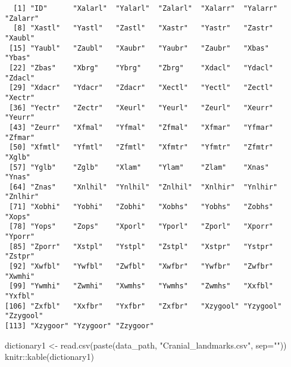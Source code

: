 \documentclass[
  letterpaper,
  DIV=11,
  numbers=noendperiod]{scrartcl}
\newenvironment{Shaded}{\begin{snugshade}}{\end{snugshade}}
\newcommand{\AttributeTok}[1]{\textcolor[rgb]{0.40,0.45,0.13}{#1}}
\newcommand{\FunctionTok}[1]{\textcolor[rgb]{0.28,0.35,0.67}{#1}}
\newcommand{\NormalTok}[1]{\textcolor[rgb]{0.00,0.23,0.31}{#1}}
\newcommand{\OtherTok}[1]{\textcolor[rgb]{0.00,0.23,0.31}{#1}}
\newcommand{\SpecialCharTok}[1]{\textcolor[rgb]{0.37,0.37,0.37}{#1}}
\newcommand{\StringTok}[1]{\textcolor[rgb]{0.13,0.47,0.30}{#1}}
\begin{document}
\begin{verbatim}
  [1] "ID"      "Xalarl"  "Yalarl"  "Zalarl"  "Xalarr"  "Yalarr"  "Zalarr" 
  [8] "Xastl"   "Yastl"   "Zastl"   "Xastr"   "Yastr"   "Zastr"   "Xaubl"  
 [15] "Yaubl"   "Zaubl"   "Xaubr"   "Yaubr"   "Zaubr"   "Xbas"    "Ybas"   
 [22] "Zbas"    "Xbrg"    "Ybrg"    "Zbrg"    "Xdacl"   "Ydacl"   "Zdacl"  
 [29] "Xdacr"   "Ydacr"   "Zdacr"   "Xectl"   "Yectl"   "Zectl"   "Xectr"  
 [36] "Yectr"   "Zectr"   "Xeurl"   "Yeurl"   "Zeurl"   "Xeurr"   "Yeurr"  
 [43] "Zeurr"   "Xfmal"   "Yfmal"   "Zfmal"   "Xfmar"   "Yfmar"   "Zfmar"  
 [50] "Xfmtl"   "Yfmtl"   "Zfmtl"   "Xfmtr"   "Yfmtr"   "Zfmtr"   "Xglb"   
 [57] "Yglb"    "Zglb"    "Xlam"    "Ylam"    "Zlam"    "Xnas"    "Ynas"   
 [64] "Znas"    "Xnlhil"  "Ynlhil"  "Znlhil"  "Xnlhir"  "Ynlhir"  "Znlhir" 
 [71] "Xobhi"   "Yobhi"   "Zobhi"   "Xobhs"   "Yobhs"   "Zobhs"   "Xops"   
 [78] "Yops"    "Zops"    "Xporl"   "Yporl"   "Zporl"   "Xporr"   "Yporr"  
 [85] "Zporr"   "Xstpl"   "Ystpl"   "Zstpl"   "Xstpr"   "Ystpr"   "Zstpr"  
 [92] "Xwfbl"   "Ywfbl"   "Zwfbl"   "Xwfbr"   "Ywfbr"   "Zwfbr"   "Xwmhi"  
 [99] "Ywmhi"   "Zwmhi"   "Xwmhs"   "Ywmhs"   "Zwmhs"   "Xxfbl"   "Yxfbl"  
[106] "Zxfbl"   "Xxfbr"   "Yxfbr"   "Zxfbr"   "Xzygool" "Yzygool" "Zzygool"
[113] "Xzygoor" "Yzygoor" "Zzygoor"
\end{verbatim}

\begin{Shaded}
\begin{Highlighting}[]
\NormalTok{dictionary1 }\OtherTok{\textless{}{-}} \FunctionTok{read.csv}\NormalTok{(}\FunctionTok{paste}\NormalTok{(data\_path, }\StringTok{"Cranial\_landmarks.csv"}\NormalTok{, }\AttributeTok{sep=}\StringTok{""}\NormalTok{))}
\NormalTok{knitr}\SpecialCharTok{::}\FunctionTok{kable}\NormalTok{(dictionary1)}
\end{Highlighting}
\end{Shaded}
\end{document}
